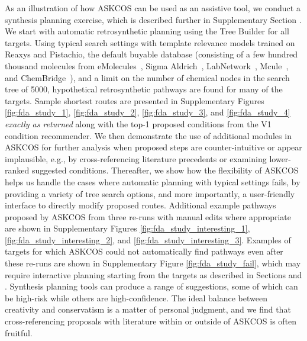 \documentclass[pdflatex,sn-mathphys-num]{sn-jnl}%
\theoremstyle{thmstyleone}%
\theoremstyle{thmstyletwo}%
\theoremstyle{thmstylethree}%
\begin{document}
As an illustration of how ASKCOS can be used as an assistive tool, we conduct a synthesis planning exercise, which is described further in Supplementary Section . We start with automatic retrosynthetic planning using the Tree Builder for all targets. Using typical search settings with template relevance models trained on Reaxys and Pistachio, the default buyable database (consisting of a few hundred thousand molecules from eMolecules~\citep{EMolecules}, Sigma Aldrich~\citep{SigmaAldrich}, LabNetwork~\citep{LabNetwork}, Mcule~\citep{Mcule}, and ChemBridge~\citep{ChemBridge}), and a limit on the number of chemical nodes in the search tree of 5000, hypothetical retrosynthetic pathways are found for many of the targets. Sample shortest routes are presented in Supplementary Figures \ref{fig:fda_study_1}, \ref{fig:fda_study_2}, \ref{fig:fda_study_3}, and \ref{fig:fda_study_4} \emph{exactly as returned} along with the top-1 proposed conditions from the V1 condition recommender. We then demonstrate the use of additional modules in ASKCOS for further analysis when proposed steps are counter-intuitive or appear implausible, e.g., by cross-referencing literature precedents or examining lower-ranked suggested conditions. Thereafter, we show how the flexibility of ASKCOS helps us handle the cases where automatic planning with typical settings fails, by providing a variety of tree search options, and more importantly, a user-friendly interface to directly modify proposed routes. Additional example pathways proposed by ASKCOS from three re-runs with manual edits where appropriate are shown in Supplementary Figures \ref{fig:fda_study_interesting_1}, \ref{fig:fda_study_interesting_2}, and \ref{fig:fda_study_interesting_3}. Examples of targets for which ASKCOS could not automatically find pathways even after these re-runs are shown in Supplementary Figure \ref{fig:fda_study_fail}, which may require interactive planning starting from the targets as described in Sections  and . Synthesis planning tools can produce a range of suggestions, some of which can be high-risk while others are high-confidence. The ideal balance between creativity and conservatism is a matter of personal judgment, and we find that cross-referencing proposals with literature within or outside of ASKCOS is often fruitful.
\end{document}
